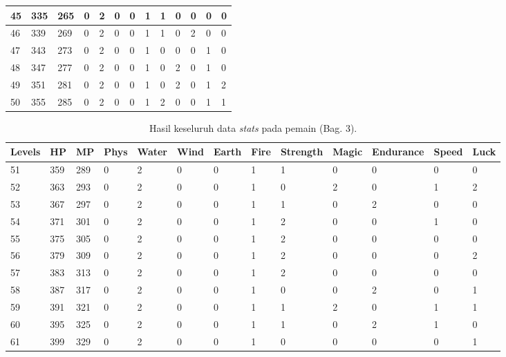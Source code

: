\begin{sidewaystable}[!h]
\begin{tabular}{|l|l|l|l|l|l|l|l|l|l|l|l|l|}
			45 & 335 & 265 & 0 & 2 & 0 & 0 & 1 & 1 & 0 & 0 & 0 & 0 \\ \hline
			46 & 339 & 269 & 0 & 2 & 0 & 0 & 1 & 1 & 0 & 2 & 0 & 0 \\ \hline
			47 & 343 & 273 & 0 & 2 & 0 & 0 & 1 & 0 & 0 & 0 & 1 & 0 \\ \hline
			48 & 347 & 277 & 0 & 2 & 0 & 0 & 1 & 0 & 2 & 0 & 1 & 0 \\ \hline
			49 & 351 & 281 & 0 & 2 & 0 & 0 & 1 & 0 & 2 & 0 & 1 & 2 \\ \hline
			50 & 355 & 285 & 0 & 2 & 0 & 0 & 1 & 2 & 0 & 0 & 1 & 1 \\ \hline
		\end{tabular}
\end{sidewaystable}
\clearpage


\begin{sidewaystable}[!h]
	\centering
	\caption{Hasil keseluruh data \textit{stats} pada pemain (Bag. 3).}
	\label{tb:player_all_stats_3}
	\vspace{1ex}
		\begin{tabular}{|l|l|l|l|l|l|l|l|l|l|l|l|l|}
			\hline
			\rowcolor[HTML]{C0C0C0} 
			\textbf{Levels} & \textbf{HP} & \textbf{MP} & \textbf{Phys} & \textbf{Water} & \textbf{Wind} & \textbf{Earth} & \textbf{Fire} & \textbf{Strength} & \textbf{Magic} & \textbf{Endurance} & \textbf{Speed} & \textbf{Luck} \\ \hline
			51 & 359 & 289 & 0 & 2 & 0 & 0 & 1 & 1 & 0 & 0 & 0 & 0 \\ \hline
			52 & 363 & 293 & 0 & 2 & 0 & 0 & 1 & 0 & 2 & 0 & 1 & 2 \\ \hline
			53 & 367 & 297 & 0 & 2 & 0 & 0 & 1 & 1 & 0 & 2 & 0 & 0 \\ \hline
			54 & 371 & 301 & 0 & 2 & 0 & 0 & 1 & 2 & 0 & 0 & 1 & 0 \\ \hline
			55 & 375 & 305 & 0 & 2 & 0 & 0 & 1 & 2 & 0 & 0 & 0 & 0 \\ \hline
			56 & 379 & 309 & 0 & 2 & 0 & 0 & 1 & 2 & 0 & 0 & 0 & 2 \\ \hline
			57 & 383 & 313 & 0 & 2 & 0 & 0 & 1 & 2 & 0 & 0 & 0 & 0 \\ \hline
			58 & 387 & 317 & 0 & 2 & 0 & 0 & 1 & 0 & 0 & 2 & 0 & 1 \\ \hline
			59 & 391 & 321 & 0 & 2 & 0 & 0 & 1 & 1 & 2 & 0 & 1 & 1 \\ \hline
			60 & 395 & 325 & 0 & 2 & 0 & 0 & 1 & 1 & 0 & 2 & 1 & 0 \\ \hline
			61 & 399 & 329 & 0 & 2 & 0 & 0 & 1 & 0 & 0 & 0 & 0 & 1 \\ \hline

\end{tabular}
\end{sidewaystable}
